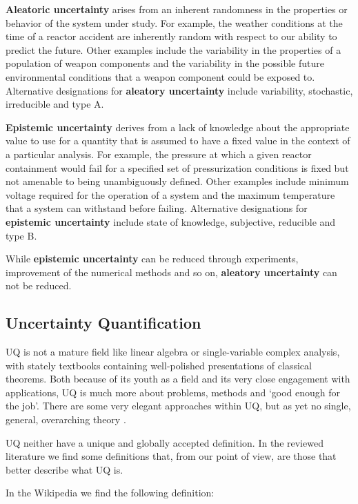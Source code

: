 \textbf{Aleatoric uncertainty} arises from an inherent randomness in the properties or behavior of the system under study. For example, the weather conditions at the time of a reactor accident are inherently random with respect to our ability to predict the future. Other examples include the variability in the properties of a population of weapon components and the variability in the possible future environmental conditions that a weapon component could be exposed to. Alternative designations for \textbf{aleatory uncertainty} include variability, stochastic, irreducible and type A. \cite{Helton2009}

\textbf{Epistemic uncertainty} derives from a lack of knowledge about the appropriate value to use for a quantity that is assumed to have a fixed value in the context of a particular analysis. For example, the pressure at which a given reactor containment would fail for a specified set of pressurization conditions is fixed but not amenable to being unambiguously defined. Other examples include minimum voltage required for the operation of a system and the maximum temperature that a system can withstand before failing. Alternative designations for \textbf{epistemic uncertainty} include state of knowledge, subjective, reducible and type B. \cite{Helton2009}

While \textbf{epistemic uncertainty} can be reduced through experiments, improvement of the numerical methods and so on, \textbf{aleatory uncertainty} can not be reduced. 


\subsection{Uncertainty Quantification}

UQ is not a mature field like linear algebra or single-variable complex analysis, with stately textbooks containing well-polished presentations of classical theorems. Both because of its youth as a field and its very close engagement with applications, UQ is much more about problems, methods and ‘good enough for the job’. There are some very elegant approaches within UQ, but as yet no single, general, overarching theory \cite{Sullivan2015}.

UQ neither have a unique and globally accepted definition. In the reviewed literature we find some definitions that, from our point of view, are those that better describe what UQ is.  

In the Wikipedia we find the following definition: 

